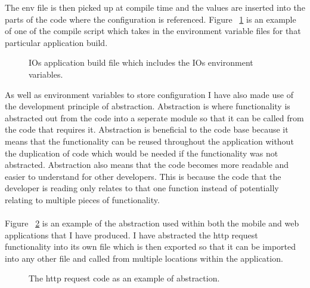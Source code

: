 \documentclass[a4paper,11pt]{report}
\begin{document}
The env file is then picked up at compile time and the values are inserted into the parts of the code where the configuration is referenced. Figure ~\ref{fig:iosScript} is an example of one of the compile script which takes in the environment variable files for that particular application build.
\begin{figure}[H]
    \centering
    \caption{IOs application build file which includes the IOs environment variables.}
    \label{fig:iosScript}
\end{figure}

As well as environment variables to store configuration I have also made use of the development principle of abstraction.
Abstraction is where functionality is abstracted out from the code into a seperate module so that it can be called from
the code that requires it. Abstraction is beneficial to the code base because it means that the functionality can be reused
throughout the application without the duplication of code which would be needed if the functionality was not abstracted.
Abstraction also means that the code becomes more readable and easier to understand for other developers. 
This is because the code that the developer is reading only relates to that one function instead of potentially 
relating to multiple pieces of functionality.
\\
\\
 Figure ~\ref{fig:request} is an example of the abstraction used within both
the mobile and web applications that I have produced. I have abstracted the http request functionality into its own file 
which is then exported so that it can be imported into any other file and called from multiple locations within the application.

\begin{figure}[H]
\centering
{}
\caption{The http request code as an example of abstraction.}
\label{fig:request}
\end{figure}
\end{document}
